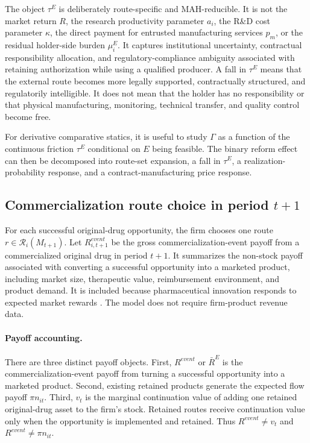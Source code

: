 \documentclass[12pt]{article}
\newcommand{\1}{\mathbf{1}}
\newcommand{\calR}{\mathcal{R}}
\begin{document}
The object $\tau^E$ is deliberately route-specific and MAH-reducible. It is not the market return $R$, the research productivity parameter $a_i$, the R\&D cost parameter $\kappa$, the direct payment for entrusted manufacturing services $p_m$, or the residual holder-side burden $\mu_i^E$. It captures institutional uncertainty, contractual responsibility allocation, and regulatory-compliance ambiguity associated with retaining authorization while using a qualified producer. A fall in $\tau^E$ means that the external route becomes more legally supported, contractually structured, and regulatorily intelligible. It does not mean that the holder has no responsibility or that physical manufacturing, monitoring, technical transfer, and quality control become free.

For derivative comparative statics, it is useful to study $\Gamma$ as a function of the continuous friction $\tau^E$ conditional on $E$ being feasible. The binary reform effect can then be decomposed into route-set expansion, a fall in $\tau^E$, a realization-probability response, and a contract-manufacturing price response.

\subsection{\texorpdfstring{Commercialization route choice in period $t+1$}{Commercialization route choice in period t+1}}

For each successful original-drug opportunity, the firm chooses one route $r\in\calR_i(M_{t+1})$. Let $R^{event}_{i,t+1}$ be the gross commercialization-event payoff from a commercialized original drug in period $t+1$. It summarizes the non-stock payoff associated with converting a successful opportunity into a marketed product, including market size, therapeutic value, reimbursement environment, and product demand. It is included because pharmaceutical innovation responds to expected market rewards \citep{AcemogluLinn2004,DuboisDeMouzonScottMortonSeabright2015,BarwickXiaXia2026}. The model does not require firm-product revenue data.

\paragraph{Payoff accounting.}
There are three distinct payoff objects. First, $R^{event}$ or $\bar R^E$ is the commercialization-event payoff from turning a successful opportunity into a marketed product. Second, existing retained products generate the expected flow payoff $\pi n_{it}$. Third, $v_t$ is the marginal continuation value of adding one retained original-drug asset to the firm's stock. Retained routes receive continuation value only when the opportunity is implemented and retained. Thus $R^{event}\neq v_t$ and $R^{event}\neq \pi n_{it}$.
\end{document}
